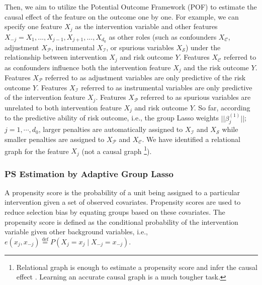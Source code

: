 \documentclass[letterpaper]{article} %
\theoremstyle{definition}
\theoremstyle{remark}
\begin{document}
Then, we aim to utilize the Potential Outcome Framework (POF) \cite{rubin1974estimating,chu2020matching,chu2022learning} to estimate the causal effect of the feature on the outcome one by one. For example, we can specify one feature $X_j$ as the intervention variable and other features $X_{-j} = X_1,..., X_{j-1}, X_{j+1},..., X_{d_0}$ as other roles (such as confounders $X_\mathcal{C}$, adjustment $X_\mathcal{P}$, instrumental $X_\mathcal{I}$, or spurious variables $X_\mathcal{S}$) under the relationship between intervention $X_j$ and risk outcome $Y$. Features $X_\mathcal{C}$ referred to as confounders influence both the intervention feature $X_j$ and the risk outcome $Y$. Features $X_\mathcal{P}$ referred to as adjustment variables are only predictive of the risk outcome $Y$. Features $X_\mathcal{I}$ referred to as instrumental variables are only predictive of the intervention feature $X_j$. Features $X_\mathcal{P}$ referred to as spurious variables are unrelated to both intervention feature $X_j$ and risk outcome $Y$. So far, according to the predictive ability of risk outcome, i.e., the group Lasso weights $||\beta_j^{(1)}||$; $j=1,\cdots,d_0$, larger penalties are automatically assigned to $X_\mathcal{I}$ and $X_\mathcal{S}$ while smaller penalties are assigned to $X_\mathcal{P}$ and $X_\mathcal{C}$. We have identified a relational graph for the feature $X_j$ (not a causal graph \footnote{Relational graph is enough to estimate a propensity score and infer the causal effect \cite{shortreed2017outcome}. Learning an accurate causal graph is a much tougher task.}).


\subsubsection{PS Estimation by Adaptive Group Lasso}

A propensity score is the probability of a unit being assigned to a particular intervention given a set of observed covariates. Propensity scores are used to reduce selection bias by equating groups based on these covariates. The propensity score is defined as the conditional probability of the intervention variable given other background variables, i.e., $e(x_j, x_{-j}) \stackrel{\text{def}}{=} P(X_j=x_j\mid X_{-j}=x_{-j})$.
\end{document}
